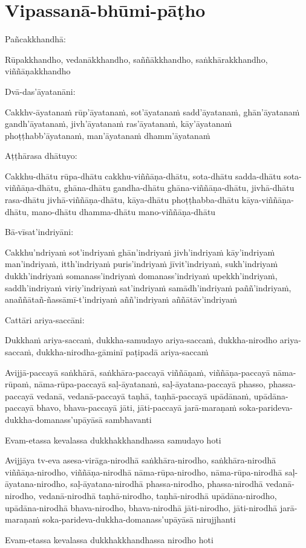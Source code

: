 \chapter{Vipassanā-bhūmi-pāṭho}


\begin{paritta}

Pañcakkhandhā:

Rūpakkhandho, vedanākkhandho, saññākkhandho, saṅkhārakkhandho,
viññāṇakkhandho

Dvā-das'āyatanāni:

Cakkhv-āyatanaṁ rūp'āyatanaṁ, sot'āyatanaṁ sadd'āyatanaṁ, ghān'āyatanaṁ
gandh'āyatanaṁ, jivh'āyatanaṁ ras'āyatanaṁ, kāy'āyatanaṁ
phoṭṭhabb'āyatanaṁ, man'āyatanaṁ dhamm'āyatanaṁ

Aṭṭhārasa dhātuyo:

Cakkhu-dhātu rūpa-dhātu cakkhu-viññāṇa-dhātu, sota-dhātu sadda-dhātu
sota-viññāṇa-dhātu, ghāna-dhātu gandha-dhātu ghāna-viññāṇa-dhātu,
jivhā-dhātu rasa-dhātu jivhā-viññāṇa-dhātu, kāya-dhātu phoṭṭhabba-dhātu
kāya-viññāṇa-dhātu, mano-dhātu dhamma-dhātu mano-viññāṇa-dhātu

Bā-vīsat'indriyāni:

Cakkhu'ndriyaṁ sot'indriyaṁ ghān'indriyaṁ jivh'indriyaṁ kāy'indriyaṁ
man'indriyaṁ, itth'indriyaṁ puris'indriyaṁ jīvit'indriyaṁ, sukh'indriyaṁ
dukkh'indriyaṁ somanass'indriyaṁ domanass'indriyaṁ upekkh'indriyaṁ,
saddh'indriyaṁ viriy'indriyaṁ sat'indriyaṁ samādh'indriyaṁ
paññ'indriyaṁ, anaññātañ-ñassāmī-t'indriyaṁ aññ'indriyaṁ
aññātāv'indriyaṁ

Cattāri ariya-saccāni:

Dukkhaṁ ariya-saccaṁ, dukkha-samudayo ariya-saccaṁ, dukkha-nirodho
ariya-saccaṁ, dukkha-nirodha-gāminī paṭipadā ariya-saccaṁ

Avijjā-paccayā saṅkhārā, saṅkhāra-paccayā viññāṇaṁ, viññāṇa-paccayā
nāma-rūpaṁ, nāma-rūpa-paccayā saḷ-āyatanaṁ, saḷ-āyatana-paccayā phasso,
phassa-paccayā vedanā, vedanā-paccayā taṇhā, taṇhā-paccayā upādānaṁ,
upādāna-paccayā bhavo, bhava-paccayā jāti, jāti-paccayā jarā-maraṇaṁ
soka-parideva-dukkha-domanass'upāyāsā sambhavanti

Evam-etassa kevalassa dukkhakkhandhassa samudayo hoti

Avijjāya tv-eva asesa-virāga-nirodhā saṅkhāra-nirodho, saṅkhāra-nirodhā
viññāṇa-nirodho, viññāṇa-nirodhā nāma-rūpa-nirodho, nāma-rūpa-nirodhā
saḷ-āyatana-nirodho, saḷ-āyatana-nirodhā phassa-nirodho, phassa-nirodhā
vedanā-nirodho, vedanā-nirodhā taṇhā-nirodho, taṇhā-nirodhā
upādāna-nirodho, upādāna-nirodhā bhava-nirodho, bhava-nirodhā
jāti-nirodho, jāti-nirodhā jarā-maraṇaṁ
soka-parideva-dukkha-domanass'upāyāsā nirujjhanti

Evam-etassa kevalassa dukkhakkhandhassa nirodho hoti

\end{paritta}

